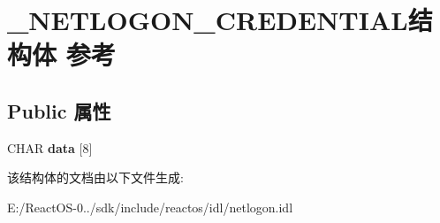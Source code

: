 \hypertarget{struct___n_e_t_l_o_g_o_n___c_r_e_d_e_n_t_i_a_l}{}\section{\+\_\+\+N\+E\+T\+L\+O\+G\+O\+N\+\_\+\+C\+R\+E\+D\+E\+N\+T\+I\+A\+L结构体 参考}
\label{struct___n_e_t_l_o_g_o_n___c_r_e_d_e_n_t_i_a_l}
\subsection*{Public 属性}
\begin{DoxyCompactItemize}
\item 
\mbox{\label{struct___n_e_t_l_o_g_o_n___c_r_e_d_e_n_t_i_a_l_ace8d2896c62169f12101b4eec86835bb}} 
C\+H\+AR {\bfseries data} \mbox{[}8\mbox{]}
\end{DoxyCompactItemize}


该结构体的文档由以下文件生成\+:\begin{DoxyCompactItemize}
\item 
E\+:/\+React\+O\+S-\/0../sdk/include/reactos/idl/netlogon.\+idl\end{DoxyCompactItemize}
